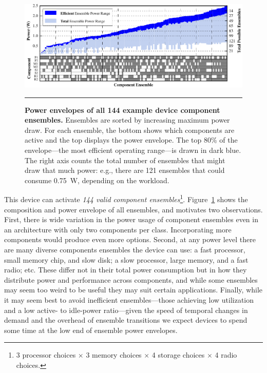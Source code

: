 \begin{figure}[t]
\includegraphics{./figures/componentgraph.pdf}

\caption{\small \textbf{Power envelopes of all 144 example device component
ensembles.} Ensembles are sorted by increasing maximum power draw. For each
ensemble, the bottom shows which components are active and the top displays
the power envelope. The top 80\% of the envelope---the most efficient
operating range---is drawn in dark blue. The right axis counts the total
number of ensembles that might draw that much power: e.g., there are 121
ensembles that could consume 0.75~W, depending on the workload.}

\vspace{0.10in}
\hrule
\vspace{-0.20in}
\label{figure-componentgraph}
\end{figure}


This device can activate \textit{144 valid component ensembles}\footnote{3
processor choices $\times$ 3 memory choices $\times$ 4 storage choices
$\times$ 4 radio choices.}. Figure~\ref{figure-componentgraph} shows the
composition and power envelope of all ensembles, and motivates two
observations. First, there is wide variation in the power usage of component
ensembles even in an architecture with only two components per class.
Incorporating more components would produce even more options. Second, at any
power level there are many diverse components ensembles the device can use: a
fast processor, small memory chip, and slow disk; a slow processor, large
memory, and a fast radio; etc. These differ not in their total power
consumption but in how they distribute power and performance across
components, and while some ensembles may seem too weird to be useful they may
suit certain applications. Finally, while it may seem best to avoid
inefficient ensembles---those achieving low utilization and a low active- to
idle-power ratio---given the speed of temporal changes in demand and the
overhead of ensemble transitions we expect devices to spend some time at the
low end of ensemble power envelopes.
